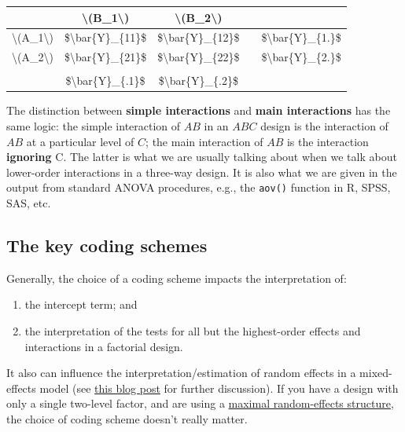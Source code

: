 \documentclass[]{book}
\providecommand{\tightlist}{%
  \setlength{\itemsep}{0pt}\setlength{\parskip}{0pt}}
\begin{document}
\begin{table}[H]
\centering
\begin{tabular}{c|c|c|c|c}
\hline
 & \textbackslash{}(B\_1\textbackslash{}) & \textbackslash{}(B\_2\textbackslash{}) &  & \\
\hline
\textbackslash{}(A\_1\textbackslash{}) & \$\textbackslash{}bar\{Y\}\_\{11\}\$ & \$\textbackslash{}bar\{Y\}\_\{12\}\$ &  & \$\textbackslash{}bar\{Y\}\_\{1.\}\$\\
\hline
\textbackslash{}(A\_2\textbackslash{}) & \$\textbackslash{}bar\{Y\}\_\{21\}\$ & \$\textbackslash{}bar\{Y\}\_\{22\}\$ &  & \$\textbackslash{}bar\{Y\}\_\{2.\}\$\\
\hline
 &  &  &  & \\
\hline
 & \$\textbackslash{}bar\{Y\}\_\{.1\}\$ & \$\textbackslash{}bar\{Y\}\_\{.2\}\$ &  & \\
\hline
\end{tabular}
\end{table}

The distinction between \textbf{simple interactions} and \textbf{main interactions} has the same logic: the simple interaction of \(AB\) in an \(ABC\) design is the interaction of \(AB\) at a particular level of \(C\); the main interaction of \(AB\) is the interaction \textbf{ignoring} C. The latter is what we are usually talking about when we talk about lower-order interactions in a three-way design. It is also what we are given in the output from standard ANOVA procedures, e.g., the \texttt{aov()} function in R, SPSS, SAS, etc.

\hypertarget{the-key-coding-schemes}{%
\subsection{The key coding schemes}\label{the-key-coding-schemes}}

Generally, the choice of a coding scheme impacts the interpretation of:

\begin{enumerate}
\def\labelenumi{\arabic{enumi}.}
\tightlist
\item
  the intercept term; and
\item
  the interpretation of the tests for all but the highest-order effects and interactions in a factorial design.
\end{enumerate}

It also can influence the interpretation/estimation of random effects in a mixed-effects model (see \href{https://talklab.psy.gla.ac.uk/simgen/rsonly.html}{this blog post} for further discussion). If you have a design with only a single two-level factor, and are using a \href{https://www.sciencedirect.com/science/article/pii/S0749596X12001180}{maximal random-effects structure}, the choice of coding scheme doesn't really matter.
\end{document}
